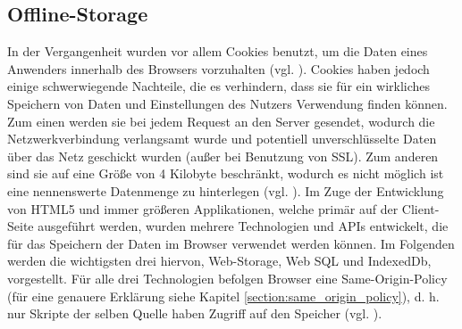 \subsection{Offline-Storage}\label{section:offline_storage}
In der Vergangenheit wurden vor allem Cookies benutzt, um die Daten eines Anwenders innerhalb des Browsers vorzuhalten (vgl. \cite{Mahemoff22010}). Cookies haben jedoch einige schwerwiegende Nachteile, die es verhindern, dass sie für ein wirkliches Speichern von Daten und Einstellungen des Nutzers Verwendung finden können. Zum einen werden sie bei jedem Request an den Server gesendet, wodurch die Netzwerkverbindung verlangsamt wurde und potentiell unverschlüsselte Daten über das Netz geschickt wurden (außer bei Benutzung von SSL). Zum anderen sind sie auf eine Größe von 4 Kilobyte beschränkt, wodurch es nicht möglich ist eine nennenswerte Datenmenge zu hinterlegen (vgl. \cite{html5upandrunningchapter7}). Im Zuge der Entwicklung von HTML5 und immer größeren Applikationen, welche primär auf der Client-Seite ausgeführt werden, wurden mehrere Technologien und APIs entwickelt, die für das Speichern der Daten im Browser verwendet werden können. Im Folgenden werden die wichtigsten drei hiervon, Web-Storage, Web SQL und IndexedDb, vorgestellt. Für alle drei Technologien befolgen Browser eine Same-Origin-Policy (für eine genauere Erklärung siehe Kapitel \ref{section:same_origin_policy}), d. h. nur Skripte der selben Quelle haben Zugriff auf den Speicher (vgl. \cite{Mahemoff2010}).


